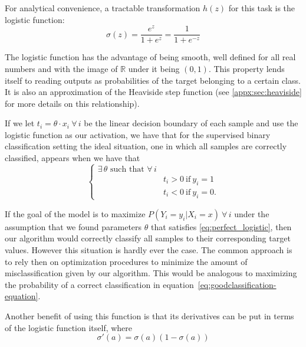 For analytical convenience, a tractable transformation $h(z)$ for this task is the logistic function:
\begin{equation}
\sigma(z) = \frac{e^{z}}{1 + e^{z}} = \frac{1}{1 + e^{-z}}
\label{eq:logisticFunction}
\end{equation}

The logistic function has the advantage of being smooth, well defined for all real numbers and with the image of $\mathbb{R}$ under it being $(0,1)$.
This property lends itself to reading outputs as probabilities of the target belonging to a certain class.
It is also an approximation of the Heaviside step function (see \cref{appx:sec:heaviside} for more details on this relationship).

If we let $t_i = \theta \cdot x_i \ \forall \, i $ be the linear decision boundary of each sample and use the logistic function as our activation, we have that for the supervised binary classification setting the ideal situation, one in which all samples are correctly classified, appears when we have that %
\begin{equation}\label{eq:perfect_logistic}
\begin{cases}
\exists \, \theta \mbox{ such that } \forall \, i \\
& t_i >0 \ \mbox{if} \ y_i=1 \\
& t_i <0 \ \mbox{if} \ y_i=0.
\end{cases}
\end{equation}


If the goal of the model is to maximize $P(Y_i = y_i | X_i = x) \ \forall \, i$
under the assumption that we found parameters $\theta$ that satisfies \cref{eq:perfect_logistic}, then our algorithm would correctly classify all samples to their corresponding target values.
However this situation is hardly ever the case.
The common approach is to rely then on optimization procedures to minimize the amount of misclassification given by our algorithm.
This would be analogous to maximizing the probability of a correct classification in equation~\eqref{eq:goodclassification-equation}.


Another benefit of using this function is that its derivatives can be put in terms of the logistic function itself, where
\begin{equation}
\sigma '(a) = \sigma(a)( 1 - \sigma(a) )
\label{eq:derivativeLogisticFunction}
\end{equation}

